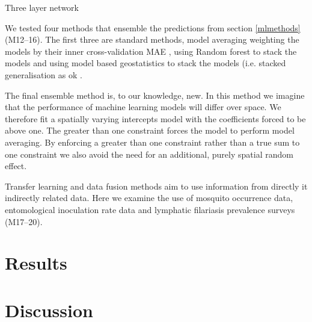\documentclass{bmcart}
\begin{document}

Three layer network



We tested four methods that ensemble the predictions from section \ref{mlmethods} (M12--16).
The first three are standard methods, model averaging weighting the models by their inner cross-validation MAE \cite{}, using Random forest to stack the models \cite{} and using model based geostatistics to stack the models (i.e. stacked generalisation as ok \cite{bhatt2017improved}.

The final ensemble method is, to our knowledge, new.
In this method we imagine that the performance of machine learning models will differ over space.
We therefore fit a spatially varying intercepts model with the coefficients forced to be above one.
The greater than one constraint forces the model to perform model averaging.
By enforcing a greater than one constraint rather than a true sum to one constraint we also avoid the need for an additional, purely spatial random effect.



Transfer learning and data fusion methods aim to use information from directly it indirectly related data.
Here we examine the use of mosquito occurrence data, entomological inoculation rate data and lymphatic filariasis prevalence surveys (M17--20).



\section*{Results}

\section*{Discussion}






\end{document}
